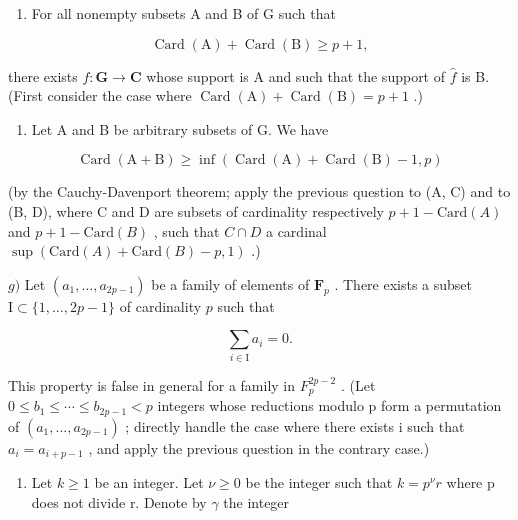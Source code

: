 \begin{enumerate}
\def\labelenumi{\alph{enumi})}
\setcounter{enumi}{4}
\tightlist
\item
  For all nonempty subsets A and B of G such that
\end{enumerate}

\[
\operatorname{Card} (\mathrm{A}) + \operatorname{Card} (\mathrm{B}) \geqslant p + 1,
\]

there exists \(f \colon \mathbf{G} \to \mathbf{C}\) whose support is A and such that the support of \(\widehat{f}\) is B. (First consider the case where \(\operatorname{Card}(\mathrm{A}) + \operatorname{Card}(\mathrm{B}) = p + 1\) .)

\begin{enumerate}
\def\labelenumi{\alph{enumi})}
\setcounter{enumi}{5}
\tightlist
\item
  Let A and B be arbitrary subsets of G. We have
\end{enumerate}

\[
\operatorname{Card} (\mathrm{A} + \mathrm{B}) \geqslant \inf (\operatorname{Card} (\mathrm{A}) + \operatorname{Card} (\mathrm{B}) - 1, p)
\]

(by the Cauchy-Davenport theorem; apply the previous question to (A, C) and to (B, D), where C and D are subsets of cardinality respectively \(p + 1 - \text{Card}(A)\) and \(p + 1 - \text{Card}(B)\) , such that \(C \cap D\) a cardinal \(\sup(\text{Card}(A) + \text{Card}(B) - p, 1)\) .)

\(g)\) Let \((a_{1},\ldots ,a_{2p - 1})\) be a family of elements of \(\mathbf{F}_p\) . There exists a subset \(\mathrm{I}\subset \{1,\dots ,2p - 1\}\) of cardinality \(p\) such that

\[
\sum_ {i \in \mathrm{I}} a _ {i} = 0.
\]

This property is false in general for a family in \(F_{p}^{2p-2}\) . (Let \(0 \leqslant b_{1} \leqslant \cdots \leqslant b_{2p-1} < p\) integers whose reductions modulo p form a permutation of \((a_{1}, \ldots, a_{2p-1})\) ; directly handle the case where there exists i such that \(a_{i} = a_{i+p-1}\) , and apply the previous question in the contrary case.)

\begin{enumerate}
\def\labelenumi{\alph{enumi})}
\setcounter{enumi}{7}
\tightlist
\item
  Let \(k \geqslant 1\) be an integer. Let \(\nu \geqslant 0\) be the integer such that \(k = p^{\nu}r\) where p does not divide r. Denote by \(\gamma\) the integer
\end{enumerate}

